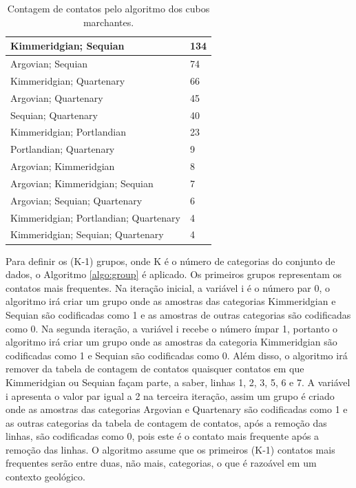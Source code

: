 \begin{table}[H]
\caption{Contagem de contatos pelo algoritmo dos cubos marchantes.} \label{table:contact_count}
\centering
\begin{tabular}{|l|l|}
\hline
Kimmeridgian; Sequian                 & 134 \\ \hline
Argovian; Sequian                     & 74  \\ \hline
Kimmeridgian; Quartenary              & 66  \\ \hline
Argovian; Quartenary                  & 45  \\ \hline
Sequian; Quartenary                   & 40  \\ \hline
Kimmeridgian; Portlandian             & 23  \\ \hline
Portlandian; Quartenary               & 9   \\ \hline
Argovian; Kimmeridgian                & 8   \\ \hline
Argovian; Kimmeridgian; Sequian       & 7   \\ \hline
Argovian; Sequian; Quartenary         & 6   \\ \hline
Kimmeridgian; Portlandian; Quartenary & 4   \\ \hline
Kimmeridgian; Sequian; Quartenary     & 4   \\ \hline
\end{tabular}
\end{table}

Para definir os (K-1) grupos, onde K é o número de categorias do conjunto de dados, o Algoritmo \ref{algo:group} é aplicado. Os primeiros grupos representam os contatos mais frequentes. Na iteração inicial, a variável i é o número par 0, o algoritmo irá criar um grupo onde as amostras das categorias Kimmeridgian e Sequian são codificadas como 1 e as amostras de outras categorias são codificadas como 0. Na segunda iteração, a variável i recebe o número ímpar 1, portanto o algoritmo irá criar um grupo onde as amostras da categoria Kimmeridgian são codificadas como 1 e Sequian são codificadas como 0. Além disso, o algoritmo irá remover da tabela de contagem de contatos quaisquer contatos em que Kimmeridgian ou Sequian façam parte, a saber, linhas 1, 2, 3, 5, 6 e 7. A variável i apresenta o valor par igual a 2 na terceira iteração, assim um grupo é criado onde as amostras das categorias Argovian e Quartenary são codificadas como 1 e as outras categorias da tabela de contagem de contatos, após a remoção das linhas, são codificadas como 0, pois este é o contato mais frequente após a remoção das linhas. O algoritmo assume que os primeiros (K-1) contatos mais frequentes serão entre duas, não mais, categorias, o que é razoável em um contexto geológico.

